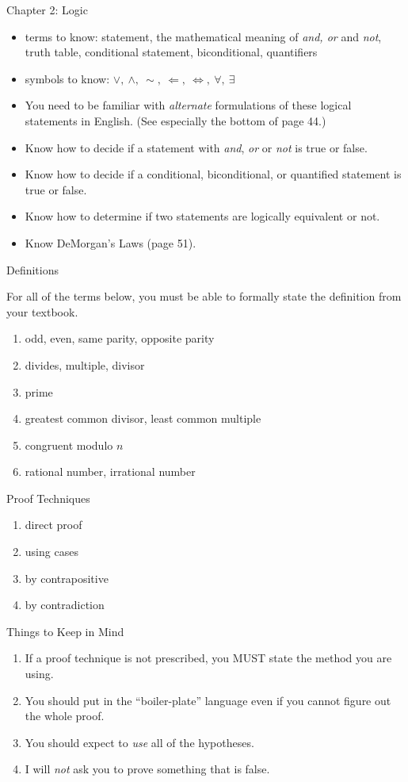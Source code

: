 \documentclass[12pt]{article}
\newcommand{\be}{\begin{enumerate}}
\newcommand{\ee}{\end{enumerate}}
\begin{document}
\begin{center} Chapter 2: Logic \end{center}

\begin{itemize}
\item terms to know: statement, the mathematical meaning of \emph{and, or} and \emph{not}, truth table, conditional statement, biconditional, quantifiers
\item symbols to know: $\vee,\: \wedge,\: \sim,\: \Leftarrow, \: \Leftrightarrow, \: \forall, \: \exists$
\item You need to be familiar with \emph{alternate} formulations of these logical statements in English. (See especially the bottom of page 44.)
\item Know how to decide if a statement with \emph{and}, \emph{or} or \emph{not} is true or false.
\item Know how to decide if a conditional, biconditional, or quantified statement is true or false.
\item Know how to determine if two statements are logically equivalent or not.
\item Know DeMorgan's Laws (page 51).
\end{itemize}


\begin{center} Definitions \end{center}

For all of the terms below, you must be able to formally state the definition from your textbook. 
\be
\item odd, even, same parity, opposite parity
\item divides, multiple, divisor
\item prime
\item greatest common divisor, least common multiple
\item congruent modulo $n$
\item rational number, irrational number
\ee

\begin{center} Proof Techniques \end{center}
\be
\item direct proof
\item using cases
\item by contrapositive
\item by contradiction
\ee

\begin{center} Things to Keep in Mind \end{center}
\be
\item If a proof technique is not prescribed, you MUST state the method you are using.
\item You should put in the ``boiler-plate'' language even if you cannot figure out the whole proof.
\item You should expect to \emph{use} all of the hypotheses.
\item I will \emph{not} ask you to prove something that is false.
\ee
\end{document}
